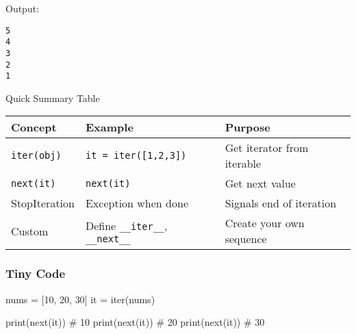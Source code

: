\documentclass[
  letterpaper,
  DIV=11,
  numbers=noendperiod]{scrreprt}
\newenvironment{Shaded}{\begin{snugshade}}{\end{snugshade}}
\newcommand{\BuiltInTok}[1]{\textcolor[rgb]{0.00,0.23,0.31}{#1}}
\newcommand{\CommentTok}[1]{\textcolor[rgb]{0.37,0.37,0.37}{#1}}
\newcommand{\DecValTok}[1]{\textcolor[rgb]{0.68,0.00,0.00}{#1}}
\newcommand{\NormalTok}[1]{\textcolor[rgb]{0.00,0.23,0.31}{#1}}
\newcommand{\OperatorTok}[1]{\textcolor[rgb]{0.37,0.37,0.37}{#1}}
\begin{document}
Output:

\begin{verbatim}
5
4
3
2
1
\end{verbatim}

Quick Summary Table

\begin{longtable}[]{@{}
  >{\raggedright\arraybackslash}p{}
  >{\raggedright\arraybackslash}p{}
  >{\raggedright\arraybackslash}p{}@{}}
\toprule\noalign{}
\begin{minipage}[b]{\linewidth}\raggedright
Concept
\end{minipage} & \begin{minipage}[b]{\linewidth}\raggedright
Example
\end{minipage} & \begin{minipage}[b]{\linewidth}\raggedright
Purpose
\end{minipage} \\
\midrule\noalign{}
\endhead
\bottomrule\noalign{}
\endlastfoot
\texttt{iter(obj)} & \texttt{it\ =\ iter({[}1,2,3{]})} & Get iterator
from iterable \\
\texttt{next(it)} & \texttt{next(it)} & Get next value \\
StopIteration & Exception when done & Signals end of iteration \\
Custom & Define \texttt{\_\_iter\_\_}, \texttt{\_\_next\_\_} & Create
your own sequence \\
\end{longtable}

\subsubsection{Tiny Code}\label{tiny-code-84}

\begin{Shaded}
\begin{Highlighting}[]
\NormalTok{nums }\OperatorTok{=}\NormalTok{ [}\DecValTok{10}\NormalTok{, }\DecValTok{20}\NormalTok{, }\DecValTok{30}\NormalTok{]}
\NormalTok{it }\OperatorTok{=} \BuiltInTok{iter}\NormalTok{(nums)}

\BuiltInTok{print}\NormalTok{(}\BuiltInTok{next}\NormalTok{(it))  }\CommentTok{\# 10}
\BuiltInTok{print}\NormalTok{(}\BuiltInTok{next}\NormalTok{(it))  }\CommentTok{\# 20}
\BuiltInTok{print}\NormalTok{(}\BuiltInTok{next}\NormalTok{(it))  }\CommentTok{\# 30}
\end{Highlighting}
\end{Shaded}
\end{document}
